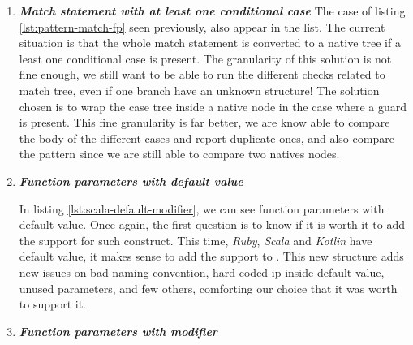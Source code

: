 \begin{enumerate}
	\item \textbf{\textit{Match statement with at least one conditional case}} \newline 
	The case of listing \ref{lst:pattern-match-fp} seen previously, also appear in the list. 
	The current situation is that the whole match statement is converted to a native tree if a least one conditional case is present. 
	The granularity of this solution is not fine enough, we still want to be able to run the different checks related to match tree, even if one branch have an unknown structure!
	The solution chosen is to wrap the case tree inside a native node in the case where a guard is present.
	This fine granularity is far better, we are know able to compare the body of the different cases and report duplicate ones, and also compare the pattern since we are still able to compare two natives nodes.
	
	\item \textbf{\textit{Function parameters with default value}} \newline 
	
	
	In listing \ref{lst:scala-default-modifier}, we can see function parameters with default value. Once again, the first question is to know if it is worth it to add the support for such construct. 
	This time, \emph{Ruby}, \emph{Scala} and \emph{Kotlin} have default value, it makes sense to add the support to \slang{}. 
	This new structure adds new issues on bad naming convention, hard coded ip inside default value, unused parameters, and few others, comforting our choice that it was worth to support it.

	\item \textbf{\textit{Function parameters with modifier}} \newline 
	 
	

\end{enumerate}
